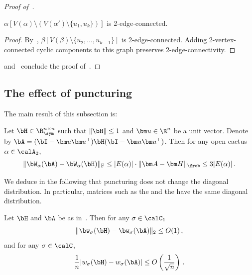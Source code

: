 \begin{proof}[Proof of~{}]
    \begin{observation}\label{obs1-open}
        $\alpha\left[V(\alpha)\setminus (V(\alpha')\setminus \{u_1,u_k\})\right]$
        is 2-edge-connected.
    \end{observation}

    \begin{proof}
        By~,
        $\beta\left[V(\beta)\setminus \{u_2, \ldots, u_{k-1}\}\right]$ is 2-edge-connected.
        Adding 2-vertex-connected cyclic components
        to this graph preserves 2-edge-connectivity.
    \end{proof}
    \noindent
     and~ conclude
    the proof of~.
\end{proof}

\subsection{The effect of puncturing}

The main result of this subsection is:

\begin{proposition}
    \label{prop:to-punctured}
    Let
    $\bH \in \R^{n \times n}_\sym$ such that $\|\bH\|\le 1$ and $\bm u\in\R^n$ be a unit vector. Denote by $\bA = (\bI - \bm u \bm u^\top) \bH (\bI - \bm u\bm u^\top)$.
    Then for any open cactus $\alpha\in\calA_2$,
    \[
        \|\bW_\alpha(\bA) - \bW_\alpha(\bH)\|_{\textnormal F}\le |E(\alpha)|\cdot \|\bm A - \bm H\|_\frob\le 3|E(\alpha)|\,.
    \]
\end{proposition}

We deduce in the following that puncturing does not change the diagonal distribution.
In particular, matrices such as the \rom and the \rrom have the same diagonal distribution.

\begin{corollary}
    \label{cor:cactus-puncturing-same}
    Let $\bH$ and $\bA$ be as in~. Then for any $\sigma\in\calC_1$
    \[
        \|\bw_\sigma(\bH) - \bw_\sigma(\bA)\|_2 \le O(1)\,,
    \]
    and for any $\sigma\in \calC$,
    \[
        \frac 1n |w_\sigma(\bH) - w_\sigma(\bA)| \le O\left(\frac 1 {\sqrt n}\right)\,.
    \]
\end{corollary}

